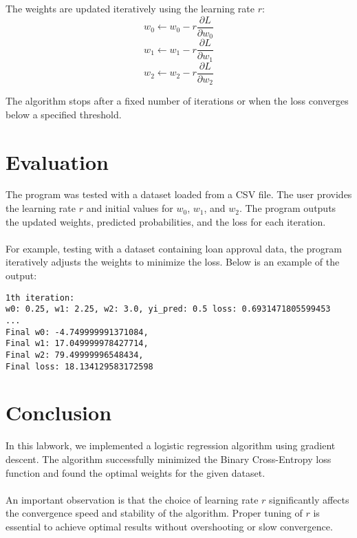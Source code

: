 \documentclass{article}
\begin{document}
The weights are updated iteratively using the learning rate $r$:\\
\[w_0 \leftarrow w_0 - r \frac{\partial L}{\partial w_0}\]
\[w_1 \leftarrow w_1 - r \frac{\partial L}{\partial w_1}\]
\[w_2 \leftarrow w_2 - r \frac{\partial L}{\partial w_2}\]

The algorithm stops after a fixed number of iterations or when the loss converges below a specified threshold.

\section{Evaluation}

The program was tested with a dataset loaded from a CSV file. The user provides the learning rate $r$ 
and initial values for $w_0$, $w_1$, and $w_2$. The program outputs the updated weights, predicted 
probabilities, and the loss for each iteration.\\
\\
For example, testing with a dataset containing loan approval data, the program iteratively adjusts the 
weights to minimize the loss. Below is an example of the output:

\begin{verbatim}
1th iteration:
w0: 0.25, w1: 2.25, w2: 3.0, yi_pred: 0.5 loss: 0.6931471805599453
...
Final w0: -4.749999991371084, 
Final w1: 17.049999978427714, 
Final w2: 79.49999996548434, 
Final loss: 18.134129583172598
\end{verbatim}

\section{Conclusion}

In this labwork, we implemented a logistic regression algorithm using gradient descent. The algorithm 
successfully minimized the Binary Cross-Entropy loss function and found the optimal weights for the 
given dataset.\\
\\
An important observation is that the choice of learning rate $r$ significantly affects the convergence 
speed and stability of the algorithm. Proper tuning of $r$ is essential to achieve optimal results 
without overshooting or slow convergence.
\end{document}
